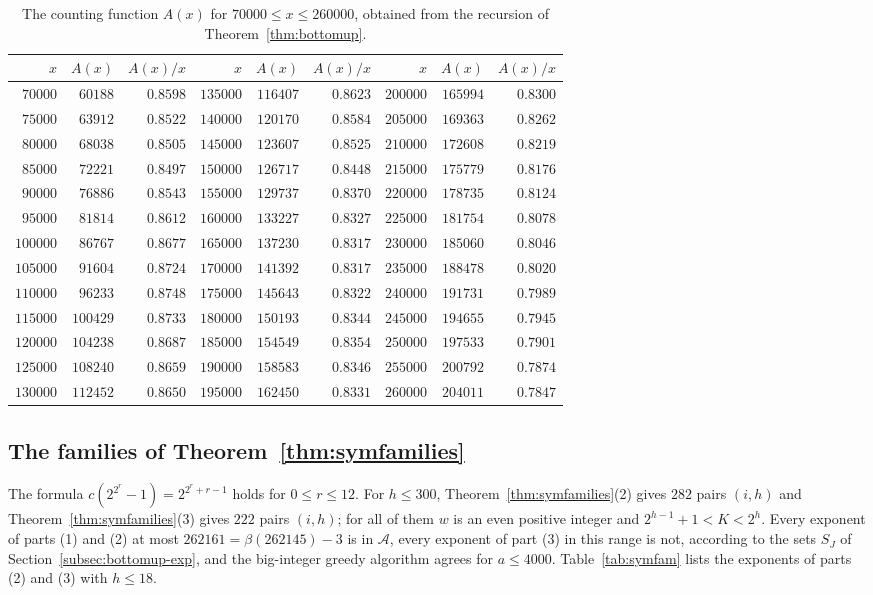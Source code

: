 \documentclass[11pt]{amsart}
\theoremstyle{definition}
\begin{document}
\begin{table}[H]
\centering
\caption{The counting function $A(x)$ for $70000\le x\le260000$, obtained from the recursion of Theorem~\ref{thm:bottomup}.}
\label{tab:counting131}
\begin{tabular}{rrr@{\qquad}rrr@{\qquad}rrr}
\toprule
$x$ & $A(x)$ & $A(x)/x$ & $x$ & $A(x)$ & $A(x)/x$ & $x$ & $A(x)$ & $A(x)/x$\\
\midrule
$70000$ & $60188$ & $0.8598$ & $135000$ & $116407$ & $0.8623$ & $200000$ & $165994$ & $0.8300$\\
$75000$ & $63912$ & $0.8522$ & $140000$ & $120170$ & $0.8584$ & $205000$ & $169363$ & $0.8262$\\
$80000$ & $68038$ & $0.8505$ & $145000$ & $123607$ & $0.8525$ & $210000$ & $172608$ & $0.8219$\\
$85000$ & $72221$ & $0.8497$ & $150000$ & $126717$ & $0.8448$ & $215000$ & $175779$ & $0.8176$\\
$90000$ & $76886$ & $0.8543$ & $155000$ & $129737$ & $0.8370$ & $220000$ & $178735$ & $0.8124$\\
$95000$ & $81814$ & $0.8612$ & $160000$ & $133227$ & $0.8327$ & $225000$ & $181754$ & $0.8078$\\
$100000$ & $86767$ & $0.8677$ & $165000$ & $137230$ & $0.8317$ & $230000$ & $185060$ & $0.8046$\\
$105000$ & $91604$ & $0.8724$ & $170000$ & $141392$ & $0.8317$ & $235000$ & $188478$ & $0.8020$\\
$110000$ & $96233$ & $0.8748$ & $175000$ & $145643$ & $0.8322$ & $240000$ & $191731$ & $0.7989$\\
$115000$ & $100429$ & $0.8733$ & $180000$ & $150193$ & $0.8344$ & $245000$ & $194655$ & $0.7945$\\
$120000$ & $104238$ & $0.8687$ & $185000$ & $154549$ & $0.8354$ & $250000$ & $197533$ & $0.7901$\\
$125000$ & $108240$ & $0.8659$ & $190000$ & $158583$ & $0.8346$ & $255000$ & $200792$ & $0.7874$\\
$130000$ & $112452$ & $0.8650$ & $195000$ & $162450$ & $0.8331$ & $260000$ & $204011$ & $0.7847$\\
\bottomrule
\end{tabular}
\end{table}

\subsection{The families of Theorem~\ref{thm:symfamilies}}
\label{subsec:symfam-exp}
The formula $c(2^{2^r}-1)=2^{2^r+r-1}$ holds for $0\le r\le12$. For $h\le300$, Theorem~\ref{thm:symfamilies}(2) gives $282$ pairs $(i,h)$ and Theorem~\ref{thm:symfamilies}(3) gives $222$ pairs $(i,h)$; for all of them $w$ is an even positive integer and $2^{h-1}+1<K<2^h$. Every exponent of parts (1) and (2) at most $262161=\beta(262145)-3$ is in $\mathcal{A}$, every exponent of part (3) in this range is not, according to the sets $S_J$ of Section~\ref{subsec:bottomup-exp}, and the big-integer greedy algorithm agrees for $a\le4000$. Table~\ref{tab:symfam} lists the exponents of parts (2) and (3) with $h\le18$.
\end{document}
